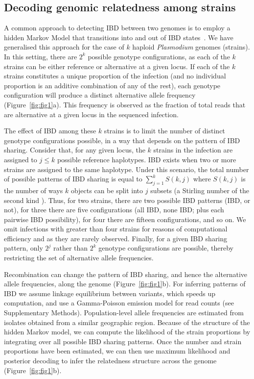 \documentclass[9pt,lineno]{elife}
\begin{document}
\subsection{Decoding genomic relatedness among strains}

A common approach to detecting IBD between two genomes is to employ a hidden Markov Model that transitions into and out of IBD states~\citep{Chang2015, Gusev2009, Gusev2011}.  We have generalised this approach for the case of $k$ haploid {\it Plasmodium} genomes (strains). In this setting, there are $2^k$ possible genotype configurations, as each of the $k$ strains can be either reference or alternative at a given locus. If each of the $k$ strains constitutes a unique proportion of the infection (and no individual proportion is an additive combination of any of the rest), each genotype configuration will produce a distinct alternative allele frequency (Figure~\ref{fig:fig1}a). This frequency is observed as the fraction of total reads that are alternative at a given locus in the sequenced infection.

The effect of IBD among these $k$ strains is to limit the number of distinct genotype configurations possible, in a way that depends on the pattern of IBD sharing. Consider that, for any given locus, the $k$ strains in the infection are assigned to $j \leq k$ possible reference haplotypes. IBD exists when two or more strains are assigned to the same haplotype. Under this scenario, the total number of possible patterns of IBD sharing is equal to $\sum_{j=1}^{k} S(k,j)$ where $S(k,j)$ is the number of ways $k$ objects can be split into $j$ subsets (a Stirling number of the second kind \citep{Ronald1988}). Thus, for two strains, there are two possible IBD patterns (IBD, or not), for three there are five configurations (all IBD, none IBD; plus each pairwise IBD possibility), for four there are fifteen configurations, and so on. We omit infections with greater than four strains for reasons of computational efficiency and as they are rarely observed. Finally, for a given IBD sharing pattern, only $2^j$ rather than $2^k$ genotype configurations are possible, thereby restricting the set of alternative allele frequencies.

Recombination can change the pattern of IBD sharing, and hence the alternative allele frequencies, along the genome (Figure~\ref{fig:fig1}b).  For inferring patterns of IBD we assume linkage equilibrium between variants, which speeds up computation, and use a Gamma-Poisson emission model for read counts (see Supplementary Methods).  Population-level allele frequencies are estimated from isolates obtained from a similar geographic region.  Because of the structure of the hidden Markov model, we can compute the likelihood of the strain proportions by integrating over all possible IBD sharing patterns.  Once the number and strain proportions have been estimated, we can then use maximum likelihood and posterior decoding to infer the relatedness structure across the genome (Figure~\ref{fig:fig1}b).
\end{document}
